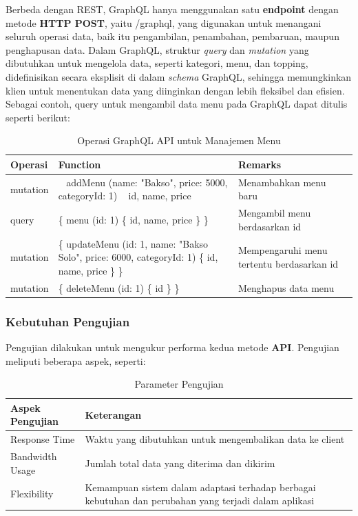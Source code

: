 \documentclass[
 manuscript=article,  %
  layout=publish, 
  year=2024, 
  month= Februari, %
  volume=8,
  number=1 
]{JIKO}
\begin{document}
Berbeda dengan REST, GraphQL hanya menggunakan satu \textbf{endpoint} dengan metode \textbf{HTTP POST}, yaitu /graphql, yang digunakan untuk menangani seluruh operasi data, baik itu pengambilan, penambahan, pembaruan, maupun penghapusan data. Dalam GraphQL, struktur \textit{query} dan \textit{mutation} yang dibutuhkan untuk mengelola data, seperti kategori, menu, dan topping, didefinisikan secara eksplisit di dalam \textit{schema} GraphQL, sehingga memungkinkan klien untuk menentukan data yang diinginkan dengan lebih fleksibel dan efisien. Sebagai contoh, query untuk mengambil data menu pada GraphQL dapat ditulis seperti berikut:
 
\begin{table}[hbt!]
	\begin{threeparttable}
		\caption{Operasi GraphQL API untuk Manajemen Menu}
		\label{tabel:graphqlmenu}
		 \begin{tabular}{lp{9cm}p{4.5cm}}
			\toprule
			\textbf{Operasi} & \textbf{Function} & \textbf{Remarks} \\
			\midrule
			mutation & \ { addMenu (name: "Bakso", price: 5000, categoryId: 1) \ { id, name, price \ } \ } & Menambahkan menu baru \\
			query & \{ menu (id: 1) \{ id, name, price \} \} & Mengambil menu berdasarkan id \\
			mutation & \{ updateMenu (id: 1, name: "Bakso Solo", price: 6000, categoryId: 1) \{ id, name, price \} \} & Mempengaruhi menu tertentu berdasarkan id \\
			mutation & \{ deleteMenu (id: 1) \{ id \} \} & Menghapus data menu \\
			\bottomrule
		\end{tabular}
	\end{threeparttable}
\end{table}

\subsubsection{Kebutuhan Pengujian}
Pengujian dilakukan untuk mengukur performa kedua metode \textbf{API}. Pengujian meliputi beberapa aspek, seperti:

\begin{table}[hbt!]
	\begin{threeparttable}
		\caption{Parameter Pengujian}
		\label{tabel:parameterpengujian}
		 \begin{tabular}{lp{10cm}}
			\toprule
			\textbf{Aspek Pengujian} & \textbf{Keterangan} \\
			\midrule
			Response Time & Waktu yang dibutuhkan untuk mengembalikan data ke client \\
			Bandwidth Usage & Jumlah total data yang diterima dan dikirim \\
			Flexibility & Kemampuan sistem dalam adaptasi terhadap berbagai kebutuhan dan perubahan yang terjadi dalam aplikasi \\
			\bottomrule
		\end{tabular}
	\end{threeparttable}
\end{table}
\end{document}
